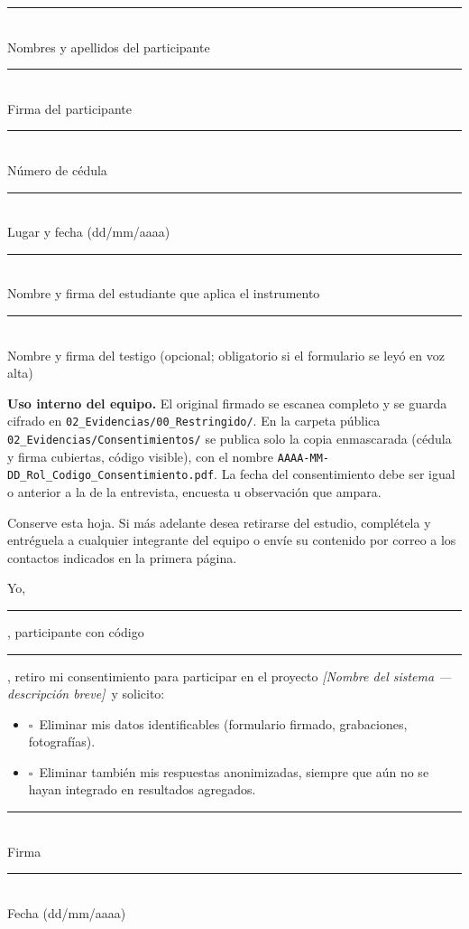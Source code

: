 \documentclass[11pt,a4paper]{article}
\newcommand{\campo}[1]{\textcolor{uteqazul}{\itshape[#1]}}
\newcommand{\Proyecto}{\campo{Nombre del sistema --- descripción breve}}
\newcommand{\caja}{\(\square\)}
\newcommand{\lineafirma}[1]{\parbox[t]{0.46\linewidth}{\centering\rule{\linewidth}{0.5pt}\\[-1pt]\small #1}}
\begin{document}
\vspace{26pt}
\noindent\lineafirma{Nombres y apellidos del participante}\hfill\lineafirma{Firma del participante}

\vspace{24pt}
\noindent\lineafirma{Número de cédula}\hfill\lineafirma{Lugar y fecha (dd/mm/aaaa)}

\vspace{24pt}
\noindent\lineafirma{Nombre y firma del estudiante que aplica el instrumento}\hfill\lineafirma{Nombre y firma del testigo (opcional; obligatorio si el formulario se leyó en voz alta)}

\vspace{10pt}
\begin{tcolorbox}[colback=campofondo,colframe=uteqoro,boxrule=0.5pt,arc=1.5mm,left=4pt,right=4pt,top=2pt,bottom=2pt]
	\footnotesize\raggedright\textbf{Uso interno del equipo.} El original firmado se escanea completo y se guarda cifrado en \texttt{02\_Evidencias/00\_Restringido/}. En la carpeta pública \texttt{02\_Evidencias/Consentimientos/} se publica solo la copia enmascarada (cédula y firma cubiertas, código visible), con el nombre \texttt{AAAA-MM-DD\_Rol\_Codigo\_Consentimiento.pdf}. La fecha del consentimiento debe ser igual o anterior a la de la entrevista, encuesta u observación que ampara.
\end{tcolorbox}

\clearpage
\begin{tcolorbox}[enhanced,colback=white,colframe=uteqverde,boxrule=0.8pt,arc=1.5mm,borderline={0.6pt}{3pt}{uteqverde,dashed},title={\bfseries 9. Revocación del consentimiento (opcional) --- desprendible para el participante},fonttitle=\normalsize,coltitle=white,colbacktitle=uteqverde]
	Conserve esta hoja. Si más adelante desea retirarse del estudio, complétela y entréguela a cualquier integrante del equipo o envíe su contenido por correo a los contactos indicados en la primera página.

	\vspace{10pt}
	Yo, \rule{7.5cm}{0.4pt}, participante con código \rule{2.6cm}{0.4pt}, retiro mi consentimiento para participar en el proyecto \Proyecto\ y solicito:
	\begin{itemize}[label={}]
		\item \caja\ Eliminar mis datos identificables (formulario firmado, grabaciones, fotografías).
		\item \caja\ Eliminar también mis respuestas anonimizadas, siempre que aún no se hayan integrado en resultados agregados.
	\end{itemize}

	\vspace{26pt}
	\noindent\lineafirma{Firma}\hfill\lineafirma{Fecha (dd/mm/aaaa)}
\end{tcolorbox}
\end{document}
